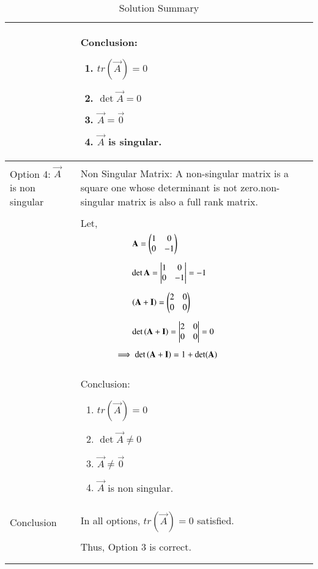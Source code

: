 \documentclass[journal,12pt]{IEEEtran}
\begin{document}
\begin{longtable}{|p{5cm}|p{13cm}|}
    & Conclusion: {\begin{enumerate}
	\item $tr(\vec{A})=0$
	\item $\det{\vec{A}}=0$
	\item $\vec{A}=\vec{0}$
	\item $\vec{A}$ is singular.\end{enumerate}}\\
    \hline
	\multirow{3}{*}{Option 4: $\vec{A}$ is non singular}&\\
  	& Non Singular Matrix:
A non-singular matrix is a square one whose determinant is not zero.non-singular matrix is also  a full rank matrix.\\
&\\
	& Let,\\
	& $\qquad\qquad\qquad\mathbf{A}=\begin{pmatrix}1&0\\0&-1\end{pmatrix}$\\
	&\\
	& $\qquad\qquad\qquad\det{\mathbf{A}} = \begin{vmatrix}1&0\\0&-1\end{vmatrix} = -1$\\
	&\\
	& $\qquad\qquad\qquad\left(\mathbf{A}+\mathbf{I}\right)=\begin{pmatrix}2&0\\0&0\end{pmatrix}$\\
	&\\
	& $\qquad\qquad\qquad\det\left(\mathbf{A}+\mathbf{I}\right)=\begin{vmatrix}2&0\\0&0\end{vmatrix}=0$\\
	&\\
	& $\qquad\qquad\implies\det\left(\mathbf{A}+\mathbf{I}\right)=1+\det(\mathbf{A})$\\
	&\\
	& Conclusion: {\begin{enumerate}
	\item $tr(\vec{A})=0$
	\item $\det{\vec{A}}\neq0$
	\item $\vec{A} \neq \vec{0}$
	\item $\vec{A}$ is non singular.\end{enumerate}}\\
	\hline
	\multirow{3}{*}{Conclusion}&\\
& In all options, $tr(\vec{A})=0$ satisfied.\\
&\\
& Thus, Option 3 is correct. \\
&\\

	\hline
	\caption{Solution Summary}
    \label{table:1}
\end{longtable}
\end{document}
